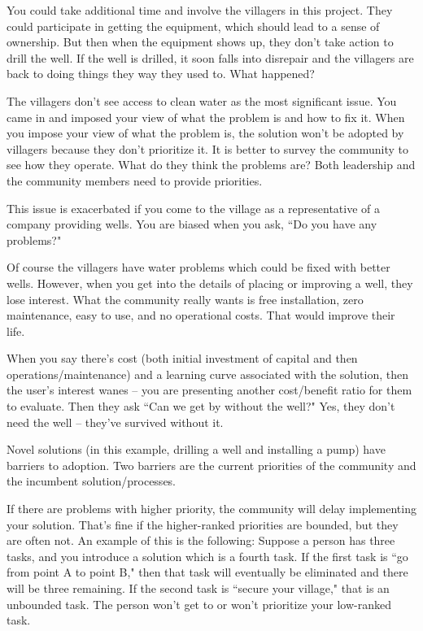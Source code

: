 You could take additional time and involve the villagers in this project. They could participate in getting the equipment, which should lead to a sense of ownership.
But then when the equipment shows up, they don't take action to drill the well. If the well is drilled, it soon falls into disrepair and the villagers are back to doing things they way they used to. What happened?

The villagers don't see access to clean water as the most significant issue. You came in and imposed your view of what the problem is and how to fix it. When you impose your view of what the problem is, the solution won't be adopted by villagers because they don't prioritize it.
It is better to survey the community to see how they operate. What do they think the problems are?
Both leadership and the community members need to provide priorities.

This issue is exacerbated if you come to the village as a representative of a company providing wells. You are biased when you ask, ``Do you have any problems?"

Of course the villagers have water problems which could be fixed with better wells. However, when you get into the details of placing or improving a well, they lose interest. What the community really wants is free installation, zero maintenance, easy to use, and no operational costs. That would improve their life.

When you say there's cost (both initial investment of capital and then operations/maintenance) and a learning curve associated with the solution, then the user's interest wanes -- you are presenting another cost/benefit ratio for them to evaluate. Then they ask ``Can we get by without the well?" Yes, they don't need the well -- they've survived without it.

Novel solutions (in this example, drilling a well and installing a pump) have barriers to adoption. Two barriers are the current priorities of the community and the incumbent solution/processes.

If there are problems with higher priority, the community will delay implementing your solution. That's fine if the higher-ranked priorities are bounded, but they are often not. An example of this is the following:
Suppose a person has three tasks, and you introduce a solution which is a fourth task.
If the first task is ``go from point A to point B," then that task will eventually be eliminated and there will be three remaining.
If the second task is ``secure your village," that is an unbounded task. The person won't get to or won't prioritize your low-ranked task.

